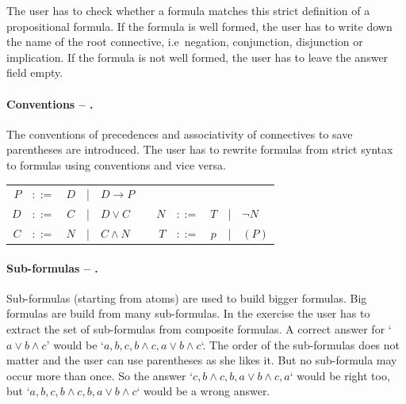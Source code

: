 The user has to check whether a formula matches this strict definition of 
a propositional formula.
If the formula is well formed, the user has to write down the name of the root connective, 
i.e\ negation, conjunction, disjunction or implication. 
If the formula is not well formed, the user has to leave the answer field empty.

\paragraph{Conventions – .}
\label{tut:22}
The conventions of precedences and associativity  of connectives to save parentheses are introduced. 
The user has to rewrite formulas from strict syntax to formulas using conventions and vice versa.

\begin{center}
\begin{tabular}{rccclp{1cm}rcccl}
$P$		&$::=$ & $D$ &|& $D \rightarrow P$ 	 \\
$D$		&$::=$ & $C$ &|& $D \vee C$		&& $N$		&$::=$ & $T$ &|& $\neg N$	\\
$C$		&$::=$ & $N$ &|& $C \wedge N$ 	&& $T$		&$::=$ & $p$ &|& $(P)$		\\
\end{tabular}
\end{center}


\paragraph{Sub-formulas – .}
\label{tut:23}
Sub-formulas (starting from atoms) are used to build bigger formulas. Big formulas are build from many sub-formulas.
In the exercise the user has to extract the set of sub-formulas from composite formulas. 
A correct answer for 
‘$a \vee b \wedge c$’ would be
‘$a,b,c,b\wedge c, a \vee b \wedge c$‘. 
The order of the sub-formulas does not matter and the user can use parentheses as she likes it.
But no sub-formula may occur more than once. 
So the answer ‘$c, b\wedge c, b, a \vee b \wedge c, a$‘ would be right too, 
but ‘$a,b,c,b\wedge c, b, a \vee b \wedge c$‘ would be a wrong answer.

